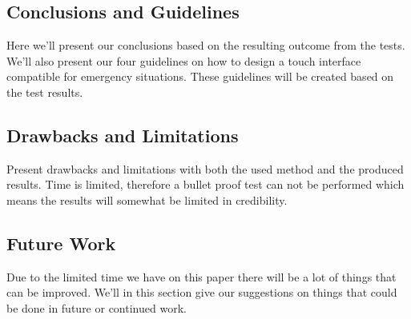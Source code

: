 \documentclass[runningheads,a4paper,oribibl]{llncs}
\begin{document}
\subsection{Conclusions and Guidelines}
Here we'll present our conclusions based on the resulting outcome from the tests. We'll also present our four guidelines on how to design a touch interface compatible for emergency situations. These guidelines will be created based on the test results.

\subsection{Drawbacks and Limitations}
Present drawbacks and limitations with both the used method and the produced results. Time is limited, therefore a bullet proof test can not be performed which means the results will somewhat be limited in credibility.

\subsection{Future Work}
Due to the limited time we have on this paper there will be a lot of things that can be improved. We'll in this section give our suggestions on things that could be done in future or continued work.

%
\nocite{*}  %

%
%
% 
%


\end{document}
